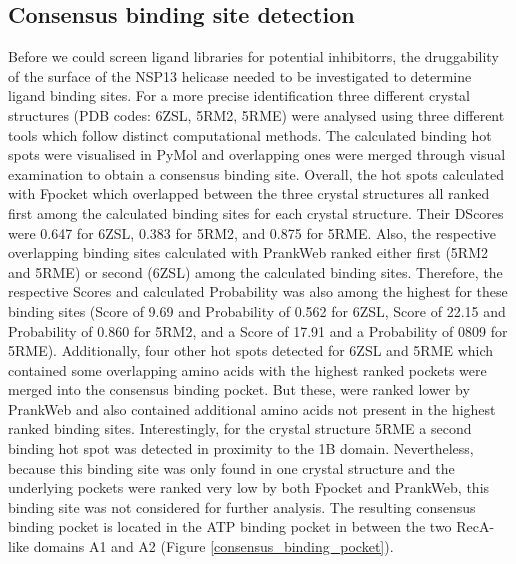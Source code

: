 \documentclass[11pt, letterpaper, titlepage]{article}
\renewcommand{\cite}{\parencite}
\begin{document}
\subsection{Consensus binding site detection}
Before we could screen ligand libraries for potential inhibitorrs, the druggability of the surface of the NSP13 helicase needed to be investigated to determine ligand binding sites. For a more precise identification three different crystal structures (PDB codes: 6ZSL, 5RM2, 5RME) were analysed using three different tools which follow distinct computational methods. The calculated binding hot spots were visualised in PyMol \cite{PyMol_endnote} and overlapping ones were merged through visual examination to obtain a consensus binding site.
Overall, the hot spots calculated with Fpocket which overlapped between the three crystal structures all ranked first among the calculated binding sites for each crystal structure. Their \acp{DScore} were 0.647 for 6ZSL, 0.383 for 5RM2, and 0.875 for 5RME. Also, the respective overlapping binding sites calculated with PrankWeb ranked either first (5RM2 and 5RME) or second (6ZSL) among the calculated binding sites. Therefore, the respective Scores and calculated Probability was also among the highest for these binding sites (Score of 9.69 and Probability of 0.562 for 6ZSL, Score of 22.15 and Probability of 0.860 for 5RM2, and a Score of 17.91 and a Probability of 0809 for 5RME). Additionally, four other hot spots detected for 6ZSL and 5RME which contained some overlapping amino acids with the highest ranked pockets were merged into the consensus binding pocket. But these, were ranked lower by PrankWeb and also contained additional amino acids not present in the highest ranked binding sites. 
Interestingly, for the crystal structure 5RME a second binding hot spot was detected in proximity to the 1B domain. Nevertheless, because this binding site was only found in one crystal structure and the underlying pockets were ranked very low by both Fpocket and PrankWeb, this binding site was not considered for further analysis.
The resulting consensus binding pocket is located in the ATP binding pocket in between the two RecA-like domains A1 and A2 (Figure \ref{consensus_binding_pocket}). 
\end{document}
